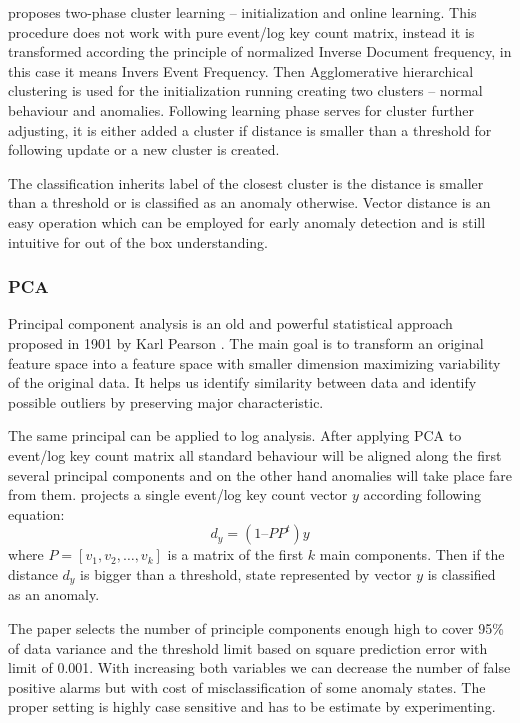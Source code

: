\cite{lin2016log} proposes two-phase cluster learning – initialization and online learning.  This procedure does not work with pure event/log key count matrix, instead it is transformed according the principle of normalized Inverse Document frequency, in this case it means Invers Event Frequency. Then Agglomerative hierarchical clustering is used for the initialization running creating two clusters – normal behaviour and anomalies. Following learning phase serves for cluster further adjusting, it is either added a cluster if distance is smaller than a threshold for following update or a new cluster is created.

The classification inherits label of the closest cluster is the distance is smaller than a threshold or is classified as an anomaly otherwise. Vector distance is an easy operation which can be employed for early anomaly detection and is still intuitive for out of the box understanding.

\subsubsection{PCA}

Principal component analysis is an old and powerful statistical approach proposed in 1901 by Karl Pearson . The main goal is to transform an original feature space into a feature space with smaller dimension maximizing variability of the original data. It helps us identify similarity between data and identify possible outliers by preserving major characteristic.

The same principal can be applied to log analysis. After applying PCA to event/log key count matrix all standard behaviour will be aligned along the first several principal components and on the other hand anomalies will take place fare from them. \cite{xu2009detecting} projects a single event/log key count vector $y$ according following equation:
\begin{equation}
\label{eq:sota_adetect_pca}
d_{y} = (1 – PP^{t})y
\end{equation}
\ms{,} where $P = [ v_{1}, v_{2}, … , v_{k}]$ is a matrix of the first $k$ main components. Then if the distance $ d_{y}$ is bigger than a threshold, state represented by vector $y$ is classified as an anomaly. 

The paper selects the number of principle components enough high to cover 95\% of data variance and the threshold limit based on square prediction error with limit of 0.001. With increasing both variables we can decrease the number of false positive alarms but with cost of misclassification of some anomaly states. The proper setting is highly case sensitive and has to be estimate by experimenting.

